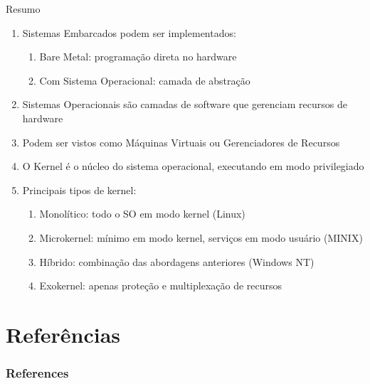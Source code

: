 \documentclass{beamer}
\begin{document}
\begin{frame}{Resumo}
\begin{enumerate}\small
    \item Sistemas Embarcados podem ser implementados:
    \begin{enumerate}\footnotesize
        \item Bare Metal: programação direta no hardware
        \item Com Sistema Operacional: camada de abstração
    \end{enumerate}
    
    \vfill
    \item Sistemas Operacionais são camadas de software que gerenciam recursos de hardware
    
    \vfill
    \item Podem ser vistos como Máquinas Virtuais ou Gerenciadores de Recursos
    
    \vfill
    \item O Kernel é o núcleo do sistema operacional, executando em modo privilegiado
    
    \vfill
    \item Principais tipos de kernel:
    \begin{enumerate}\footnotesize
        \item Monolítico: todo o SO em modo kernel (Linux)
        \item Microkernel: mínimo em modo kernel, serviços em modo usuário (MINIX)
        \item Híbrido: combinação das abordagens anteriores (Windows NT)
        \item Exokernel: apenas proteção e multiplexação de recursos
    \end{enumerate}
\end{enumerate}
\end{frame}

\section{Referências}
\begin{frame}[t, allowframebreaks]
    \frametitle{References}
    \printbibliography
\end{frame}
\end{document}
